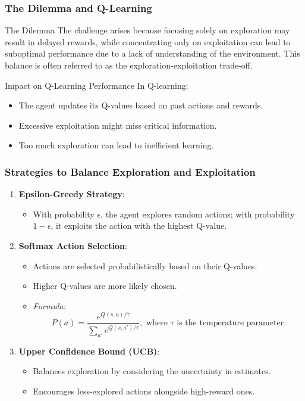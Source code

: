 \documentclass{beamer}
\begin{document}
\begin{frame}[fragile]
    \frametitle{The Dilemma and Q-Learning}
    \begin{block}{The Dilemma}
        The challenge arises because focusing solely on exploration may result in delayed rewards, while concentrating only on exploitation can lead to suboptimal performance due to a lack of understanding of the environment.
        This balance is often referred to as the exploration-exploitation trade-off.
    \end{block}
    
    \begin{block}{Impact on Q-Learning Performance}
        In Q-learning:
        \begin{itemize}
            \item The agent updates its Q-values based on past actions and rewards.
            \item Excessive exploitation might miss critical information.
            \item Too much exploration can lead to inefficient learning.
        \end{itemize}
    \end{block}
\end{frame}

\begin{frame}[fragile]
    \frametitle{Strategies to Balance Exploration and Exploitation}
    \begin{enumerate}
        \item \textbf{Epsilon-Greedy Strategy}:
            \begin{itemize}
                \item With probability $\epsilon$, the agent explores random actions; with probability $1 - \epsilon$, it exploits the action with the highest Q-value.
            \end{itemize}
        
        \item \textbf{Softmax Action Selection}:
            \begin{itemize}
                \item Actions are selected probabilistically based on their Q-values.
                \item Higher Q-values are more likely chosen.
                \item \textit{Formula:} 
                \[
                P(a) = \frac{e^{Q(s,a)/\tau}}{\sum_{a'} e^{Q(s,a')/\tau}}, \text{ where } \tau \text{ is the temperature parameter.}
                \]
            \end{itemize}
        
        \item \textbf{Upper Confidence Bound (UCB)}:
            \begin{itemize}
                \item Balances exploration by considering the uncertainty in estimates.
                \item Encourages less-explored actions alongside high-reward ones.
            \end{itemize}
    \end{enumerate}
\end{frame}
\end{document}
